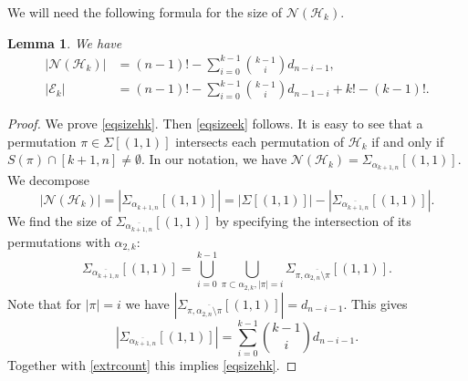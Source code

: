 \documentclass[11pt]{extarticle}
\numberwithin{equation}{section} %
\theoremstyle{plain}
\newtheorem{lem}[thm]{Lemma}
\theoremstyle{definition}
\newcommand{\m}{\mathcal}
\newcommand{\HH}{\mathcal{H}}
\begin{document}
We will need the following formula for the size of $\m N(\m H_k)$.
\begin{lem}\label{lemsizes} We have
\begin{align} 
    \label{eqsizehk} |\m{N}(\HH_k)|&= (n-1)! - 
    \sum_{i=0}^{k-1}{k-1 \choose i}d_{n-i-1}, \\
\label{eqsizeek}|\m{E}_k| &= (n-1)! - \sum_{i = 0}^{k-1} {k-1 \choose i} d_{n-1-i} + k! - (k-1)!.
\end{align}
\end{lem}
\begin{proof}
    We prove \eqref{eqsizehk}. Then \eqref{eqsizeek} follows.   It is easy to see that a permutation $\pi \in \Sigma[(1, 1)]$ intersects each permutation of $\HH_k$ if and only if $S(\pi)\cap [k+1,n]\ne \emptyset.$   In our notation, we have $\m{N}(\HH_k) = \Sigma_{\alpha_{k+1,n}}[(1, 1)]$. We decompose 
\begin{equation} \label{extrcount}
|\m{N}(\HH_k)| = |\Sigma_{\alpha_{k+1,n}}[(1, 1)]| 
 = |\Sigma[(1, 1)]| - |\Sigma_{\overline{\alpha_{k+1,n}}}[(1, 1)]|.
\end{equation} We find the size of $\Sigma_{ \overline{\alpha_{k+1,n}}}[(1, 1)]$ by specifying the intersection of its permutations with  $\alpha_{2, k}$:
$$
\Sigma_{\overline{\alpha_{k+1,n}}}[(1, 1)] = \bigcup_{i=0}^{k-1} \bigcup_{\pi \subset \alpha_{2,k}, |\pi| = i} \Sigma_{\pi, \overline{\alpha_{2,n}\setminus \pi}}[(1,1)].
$$
Note that for $|\pi|=i$  we have $|\Sigma_{\pi, \overline{\alpha_{2,n}\setminus \pi}}[(1,1)]|= d_{n-i-1}$. This gives
$$
|\Sigma_{\overline{\alpha_{k+1,n}}}[(1, 1)]| = \sum_{i=0}^{k-1}{k-1 \choose i}d_{n-i-1}.
$$
Together with \eqref{extrcount} this implies \eqref{eqsizehk}.
\end{proof}
\end{document}
